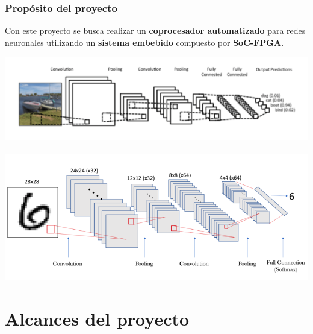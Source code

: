 \documentclass{beamer}
\begin{document}
\begin{frame}[allowframebreaks,t]

\frametitle{Propósito del proyecto}

\justifying

Con este proyecto se busca realizar un \textbf{coprocesador automatizado} para redes neuronales utilizando un \textbf{sistema embebido} compuesto por \textbf{SoC-FPGA}. \\

\centering

\includegraphics[scale=0.26]{Figuras/AP1} \\\
\includegraphics[scale=0.26]{Figuras/AP2}

\end{frame}

\section{Alcances del proyecto}
\end{document}
